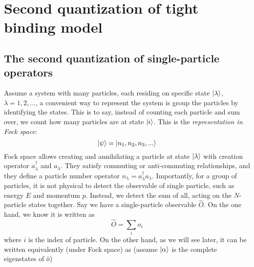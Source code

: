 \documentclass{article}
\begin{document}
\section{Second quantization of tight binding model}
\subsection{The second quantization of single-particle operators}

Assume a system with many particles, each residing on specific state $\ket{\lambda}$, $\lambda=1,2,...$, a convenient way to represent the system is group the particles by identifying the states.  This is to say, instead of counting each particle and sum over, we count how many particles are at state $\ket{i}$. This is the \textit{representation in Fock space}:
\begin{equation}
    \ket{\psi}=\ket{n_1,n_2,n_3,...}
\end{equation}
Fock space allows creating and annihilating a particle at state $\ket{\lambda}$ with creation operator $a^{\dag}_\lambda$ and $a_\lambda$. They satisfy commuting or anti-commuting relationships, and they define a particle number operator $n_\lambda = a^{\dag}_\lambda a_\lambda$. Importantly, for a group of particles, it is not physical to detect the observable of single particle, such as energy $E$ and momentum $p$. Instead, we detect the sum of all, acting on the $N$-particle states together. Say we have a single-particle observable $\hat{O}$. On the one hand, we know it is written as
\begin{equation}
    \hat{O} = \underset{i}{\sum}\hat{o}_i
\end{equation}
where $i$ is the index of particle. On the other hand, as we will see later, it can be written equivalently (under Fock space) as (assume $\ket{\alpha}$ is the complete eigenstates of $\hat{o}$)
\end{document}
